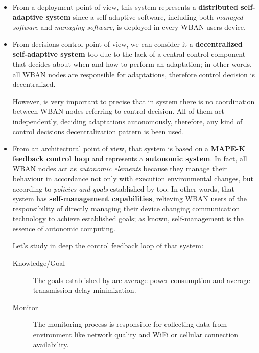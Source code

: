 \documentclass[sigchi]{acmart}
\begin{document}
\begin{itemize}

\item From a deployment point of view, this system represents a \textbf{distributed self-adaptive system} since a self-adaptive software, including both \textit{managed software} and \textit{managing software}, is deployed in every WBAN users device.\cite{PatternsDecentralizedSelf}

\item From decisions control point of view, we can consider it a \textbf{decentralized self-adaptive system} too due to the lack of a central control component that decides about when and how to perform an adaptation; in other words, all WBAN nodes are responsible for adaptations, therefore control decision is decentralized.\cite{PatternsDecentralizedSelf} 

However, is very important to precise that in \citet{MSAReport} system there is no coordination between WBAN nodes referring to control decision. All  of them act independently, deciding adaptations autonomously, therefore, any kind of control decisions decentralization pattern is been used.  

\item From an architectural point of view, that system is based on a \textbf{MAPE-K feedback control loop} and represents a \textbf{autonomic system}. In fact, all WBAN nodes act as \textit{autonomic elements} because they manage their behaviour in accordance not only with execution environmental changes, but according to \textit{policies and goals} established by \citep{MSAReport} too. In other words, that system has \textbf{self-management capabilities}, relieving WBAN users of the responsibility of directly managing their device changing communication technology to achieve established goals; as known, self-management is the essence of autonomic computing.\cite{visionOf}

Let's study in deep the control feedback loop of that system:
\begin{description}

\item[Knowledge/Goal] The goals established by \citet{MSAReport} are average power consumption and average transmission delay minimization.

\item[Monitor] The monitoring process is responsible for collecting data from environment like network quality and WiFi or cellular connection availability. 


\end{description}
\end{itemize}
\end{document}
